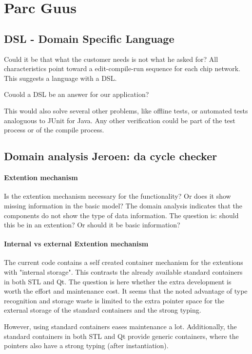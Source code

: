 \section{Parc Guus}

\subsection{DSL - Domain Specific Language}
Could it be that what the customer needs is not what he asked for?
All characteristics point toward a edit-compile-run sequence for each chip network.
This suggests a language with a DSL.

Couold a DSL be an answer for our application?

This would also solve several other problems, like offline tests, or automated tests analoguous
to JUnit for Java. Any other verification could be part of the test process or of the compile process.

\subsection{Domain analysis Jeroen: da cycle checker}

\paragraph{Extention mechanism}

Is the extention mechanism necessary for the functionality? Or does it show missing information
in the basic model? The domain analysis indicates that the components do not show the type of
data information. The question is: should this be in an extention? Or should it be basic information?

\paragraph{Internal vs external Extention mechanism}

The current code contains a self created container mechanism for the extentions with "internal storage".
This contrasts the already available standard containers in both STL and Qt. The question is here
whether the extra development is worth the effort and maintenance cost. It seems that the noted 
advantage of type recognition and storage waste is limited to the extra pointer space for the 
external storage of the standard containers and the strong typing.

However, using standard containers eases maintenance a lot. Additionally, the
standard containers in both STL and Qt provide generic containers, where the
pointers also have a strong typing (after instantiation).

